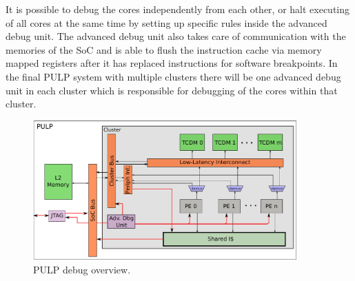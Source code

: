 It is possible to debug the cores independently from each other, or halt
executing of all cores at the same time by setting up specific rules inside the
advanced debug unit. The advanced debug unit also takes care of communication
with the memories of the \gls{SoC} and is able to flush the instruction cache
via memory mapped registers after it has replaced instructions for software
breakpoints. In the final PULP system with multiple clusters there will be one
advanced debug unit in each cluster which is responsible for debugging of the
cores within that cluster.

\begin{figure}[htbp]
  \centering
  \includegraphics[width=0.9\textwidth]{./figures/debug}
  \caption{PULP debug overview.}
  \label{fig:debug}
\end{figure}
